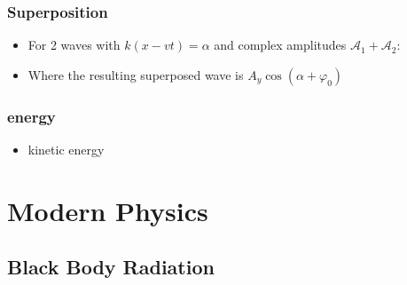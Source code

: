 \documentclass{article}
\begin{document}
\subsubsection*{Superposition}
\begin{itemize}
    \item For 2 waves with \(k(x-vt)=\alpha\) and complex amplitudes \(\mathcal{A}_1+\mathcal{A}_2\):
    \item Where the resulting superposed wave is \(A_y\cos(\alpha + \varphi_0)\)
    
\end{itemize}


\subsubsection*{energy}
\begin{itemize}
    \item kinetic energy
\end{itemize}


\newpage
\section{Modern Physics}
\subsection{Black Body Radiation}

\end{document}

